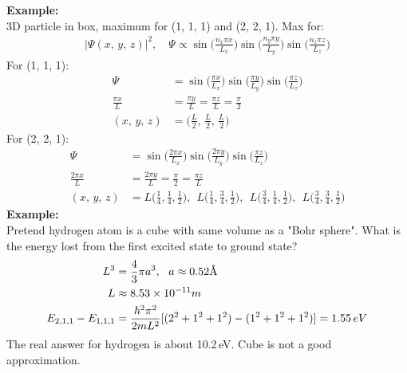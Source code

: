 \documentclass[a4paper, 11pt, normalem]{report}
\begin{document}
\textbf{Example:}\\
3D particle in box, maximum for (1, 1, 1) and (2, 2, 1).
Max for:
\begin{align}
    |\Psi(x,\,y,\,z)|^{2},\quad \Psi \propto \sin\bigg(\frac{n_{x}\pi x}{L_{x}}\bigg)\sin\bigg(\frac{n_{y}\pi y}{L_{y}}\bigg)\sin\bigg(\frac{n_{z}\pi z}{L_{z}}\bigg)
\end{align}
For (1, 1, 1):
\begin{align}
    \Psi &= \sin\bigg(\frac{\pi x}{L_{x}}\bigg)\sin\bigg(\frac{\pi y}{L_{y}}\bigg)\sin\bigg(\frac{\pi z}{L_{z}}\bigg) \\
    \frac{\pi x}{L} &= \frac{\pi y}{L} = \frac{\pi z}{L} = \frac{\pi}{2} \\
    (x,\,y,\,z) &= \bigg(\frac{L}{2},\,\frac{L}{2},\,\frac{L}{2}\bigg)
\end{align}
For (2, 2, 1):
\begin{align}
    \Psi &= \sin\bigg(\frac{2\pi x}{L_{x}}\bigg)\sin\bigg(\frac{2\pi y}{L_{y}}\bigg)\sin\bigg(\frac{\pi z}{L_{z}}\bigg) \\
    \frac{2\pi x}{L} &= \frac{2\pi y}{L} = \frac{\pi}{2} = \frac{\pi z}{L} \\
    (x,\,y,\,z) &= L\bigg(\frac{1}{4},\frac{1}{4},\frac{1}{2}\bigg),~~ L\bigg(\frac{1}{4},\frac{3}{4},\frac{1}{2}\bigg),~~ L\bigg(\frac{3}{4},\frac{1}{4},\frac{1}{2}\bigg),~~ L\bigg(\frac{3}{4},\frac{3}{4},\frac{1}{2}\bigg)
\end{align}
\textbf{Example:}\\
Pretend hydrogen atom is a cube with same volume as a "Bohr sphere".
What is the energy lost from the first excited state to ground state?
\begin{align}
    L^{3} &= \frac{4}{3}\pi a^{3},~~a \approx 0.52\text{\r{A}} \\
    L &\approx 8.53\times10^{-11}m \\
    E_{2,1,1} - E_{1,1,1} &= \frac{\hbar^{2}\pi^{2}}{2mL^{2}}[(2^{2} + 1^{2} + 1^{2}) - (1^{2} + 1^{2} + 1^{2})] = 1.55\,eV
\end{align}
The real answer for hydrogen is about 10.2\,eV.
Cube is not a good approximation.
\end{document}
